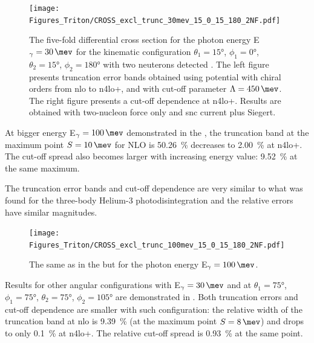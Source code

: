     \begin{figure}[h]
        \begin{center}
            \texttt{[image: Figures\_Triton/CROSS\_excl\_trunc\_30mev\_15\_0\_15\_180\_2NF.pdf]}
            \end{center}
            \caption{The five-fold differential cross section for the photon 
            energy E$_\gamma=\SI{30}{\mev}$ for the kinematic configuration
            $\theta_1 = \ang{15}$, $\phi_1 = \ang{0}$,
            $\theta_2 = \ang{15}$, $\phi_2 = \ang{180}$ with two neuterons detected .
            The left figure presents truncation error bands obtained using potential
            with chiral orders from \gls{nlo} to \gls{n4lo+}, and with
            cut-off parameter $\Lambda=\SI{450}{\mev}$.
            The right figure presents a cut-off dependence at \gls{n4lo+}.
            Results are obtained with two-nucleon force only and \gls{snc} current plus Siegert.}
            \label{CROSS_Triton_EXCL_30_15_0_15_180}
    \end{figure}

    At bigger energy E$_\gamma=\SI{100}{\mev}$ demonstrated in the ,
    the truncation band at the maximum point $S=\SI{10}{\mev}$ for NLO is \SI{50.26}{\percent}
    decreases to \SI{2.00}{\percent} at \gls{n4lo+}.
    The cut-off spread also becomes larger with increasing energy value: \SI{9.52}{\percent}
    at the same maximum.

    The truncation error bands and cut-off dependence are very similar to what was found for
    the three-body Helium-3 photodisintegration and the relative errors 
    have similar magnitudes.

    \begin{figure}[h]
        \begin{center}
            \texttt{[image: Figures\_Triton/CROSS\_excl\_trunc\_100mev\_15\_0\_15\_180\_2NF.pdf]}
            \end{center}
            \caption{The same as in the  but for the photon energy
            E$_\gamma = \SI{100}{\mev}$.}
            \label{CROSS_Triton_EXCL_100mev_15_0_15_180}
    \end{figure}



    Results for other angular configurations with E$_\gamma=\SI{30}{\mev}$ and at 
    $\theta_1 = \ang{75}$, $\phi_1 = \ang{75}$,
    $\theta_2 = \ang{75}$, $\phi_2 = \ang{105}$ are
    demonstrated in .
    Both truncation errors and cut-off dependence are smaller with such configuration:
    the relative  width of the truncation band at \gls{nlo} is \SI{9.39}{\percent}
    (at the maximum point $S=\SI{8}{\mev}$) and drops to only \SI{0.1}{\percent}
    at \gls{n4lo+}. The relative cut-off spread is \SI{0.93}{\percent} at the same point.

